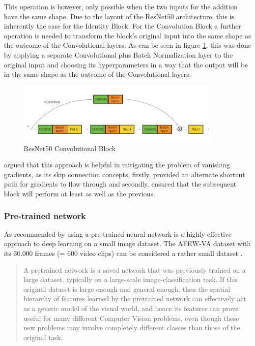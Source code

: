 This operation is however, only possible when the two inputs for the addition have the same shape. Due to the layout of the ResNet50 architecture, this is inherently the case for the Identity Block. For the Convolution Block a further operation is needed to transform the block's original input into the same shape as the outcome of the Convolutional layers. As can be seen in figure \ref{fig:ResNet50ConvBlock}, this was done by applying a separate Convolutional plus Batch Normalization layer to the original input and choosing its hyperparameters in a way that the output will be in the same shape as the outcome of the Convolutional layers.

\begin{figure}[H]
  \begin{center}
  \includegraphics[angle=0, width=0.9\textwidth]{Figures/ResNet50_ConvBlock.png}
  \caption{ResNet50 Convolutional Block\citep{Dwivedi:2019:ResNetInKeras}}
  \label{fig:ResNet50ConvBlock}
  \end{center}
\end{figure}

\citet{Dwivedi:2019:ResNetInKeras} argued that this approach is helpful in mitigating the problem of vanishing gradients, as its skip connection concepts, firstly, provided an alternate shortcut path for gradients to flow through and secondly, ensured that the subsequent block will perform at least as well as the previous.

\subsubsection{Pre-trained network}
As recommended by \citet{Chollet:2017:DeepLearningPython} using a pre-trained neural network is a highly effective approach to deep learning on a small image dataset. The AFEW-VA dataset with its 30.000 frames (= 600 video clips) can be considered a rather small dataset \citep{Kossaifi:2017:AFEW-VADatabase}.

\begin{quote}
    A pretrained network is a saved network that was previously trained on a large dataset, typically on a large-scale image-classification task. If this original dataset is large enough and general enough, then the spatial hierarchy of features learned by the pretrained network can effectively act as a generic model of the visual world, and hence its features can prove useful for many different Computer Vision problems, even though these new problems may involve completely different classes than those of the original task. \citep[~p. 143]{Chollet:2017:DeepLearningPython}
\end{quote}

